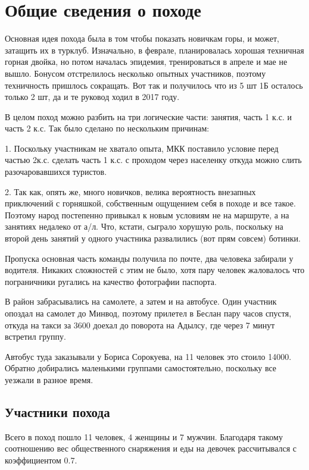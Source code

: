 \documentclass[]{article}
\begin{document}
	
\section{Общие сведения о походе}
Основная идея похода была в том чтобы показать новичкам горы, и может, затащить их в турклуб. Изначально, в феврале, планировалась хорошая техничная горная двойка, но потом началась эпидемия, тренироваться в апреле и мае не вышло. Бонусом отстрелилось несколько опытных участников, поэтому техничность пришлось сокращать. Вот так и получилось что из 5 шт 1Б осталось только 2 шт, да и те руковод ходил в 2017 году.

В целом поход можно разбить на три логические части: занятия, часть 1 к.с. и часть 2 к.с. Так было сделано по нескольким причинам:

1. Поскольку участникам не хватало опыта, МКК поставило условие перед частью 2к.с. сделать часть 1 к.с. с проходом через населенку откуда можно слить разочаровавшихся туристов.

2. Так как, опять же, много новичков, велика вероятность внезапных приключений с горняшкой, собственным ощущением себя в походе и все такое. Поэтому народ постепенно привыкал к новым условиям не на маршруте, а на занятиях недалеко от а/л. Что, кстати, сыграло хорушую роль, поскольку на второй день занятий у одного участника развалились (вот прям совсем) ботинки.

Пропуска основная часть команды получила по почте, два человека забирали у водителя. Никаких сложностей с этим не было, хотя пару человек жаловалось что пограничники ругались на качество фотографии паспорта.

В район забрасывались на самолете, а затем и на автобусе. Один участник опоздал на самолет до Минвод, поэтому прилетел в Беслан пару часов спустя, откуда на такси за 3600 доехал до поворота на Адылсу, где через 7 минут встретил группу.

Автобус туда заказывали у Бориса Сорокуева, на 11 человек это стоило 14000. Обратно добирались маленькими группами самостоятельно, поскольку все уезжали в разное время.

 
\subsection{Участники похода}
Всего в поход пошло 11 человек, 4 женщины и 7 мужчин. Благодаря такому соотношению вес общественного снаряжения и еды на девочек рассчитывался с коэффициентом 0.7.
	
\end{document}
